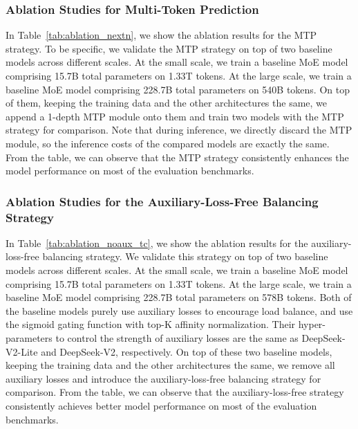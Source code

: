 \documentclass[11pt, a4paper, logo, copyright, nonumbering]{deepseek}
\newcommand{\dsvii}{DeepSeek-V2}
\begin{document}
\begin{CJK*}{UTF8}{gbsn}
\subsubsection{Ablation Studies for Multi-Token Prediction}
\label{discussion:ablation_nextn}

In Table~\ref{tab:ablation_nextn}, we show the ablation results for the MTP strategy. 
To be specific, we validate the MTP strategy on top of two baseline models across different scales. 
At the small scale, we train a baseline MoE model comprising 15.7B total parameters on 1.33T tokens. 
At the large scale, we train a baseline MoE model comprising 228.7B total parameters on 540B tokens. 
On top of them, keeping the training data and the other architectures the same, we append a 1-depth MTP module onto them and train two models with the MTP strategy for comparison. 
Note that during inference, we directly discard the MTP module, so the inference costs of the compared models are exactly the same. 
From the table, we can observe that the MTP strategy consistently enhances the model performance on most of the evaluation benchmarks. 

\subsubsection{Ablation Studies for the Auxiliary-Loss-Free Balancing Strategy}
\label{discussion:ablation_noaux_tc}

In Table~\ref{tab:ablation_noaux_tc}, we show the ablation results for the auxiliary-loss-free balancing strategy.
We validate this strategy on top of two baseline models across different scales. 
At the small scale, we train a baseline MoE model comprising 15.7B total parameters on 1.33T tokens. 
At the large scale, we train a baseline MoE model comprising 228.7B total parameters on 578B tokens. 
Both of the baseline models purely use auxiliary losses to encourage load balance, and use the sigmoid gating function with top-K affinity normalization. 
Their hyper-parameters to control the strength of auxiliary losses are the same as \dsvii{}-Lite and \dsvii{}, respectively. 
On top of these two baseline models, keeping the training data and the other architectures the same, we remove all auxiliary losses and introduce the auxiliary-loss-free balancing strategy for comparison. 
From the table, we can observe that the auxiliary-loss-free strategy consistently achieves better model performance on most of the evaluation benchmarks. 


\end{CJK*}
\end{document}

